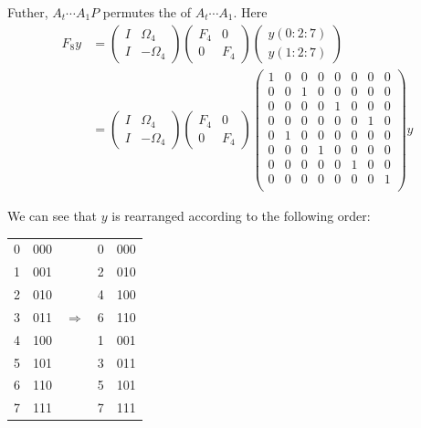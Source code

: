 Futher, $A_t \cdots A_1 P$ permutes the  of $A_t \cdots A_1$. Here \begin{align*}
    F_8 y & = \begin{pmatrix}
        I & \Omega_4 \\
        I & -\Omega_4
    \end{pmatrix} \begin{pmatrix}
        F_4 & 0 \\
        0 & F_4
    \end{pmatrix} \begin{pmatrix}
        y(0: 2 : 7) \\
        y(1: 2 : 7)
    \end{pmatrix} \\
    & = \begin{pmatrix}
        I & \Omega_4 \\
        I & -\Omega_4
    \end{pmatrix} \begin{pmatrix}
        F_4 & 0 \\
        0 & F_4
    \end{pmatrix} \begin{pmatrix}
        1   &   0   &   0   &   0   &   0   &   0   &   0   &   0   \\
        0   &   0   &   1   &   0   &   0   &   0   &   0   &   0   \\
        0   &   0   &   0   &   0   &   1   &   0   &   0   &   0   \\
        0   &   0   &   0   &   0   &   0   &   0   &   1   &   0   \\
        0   &   1   &   0   &   0   &   0   &   0   &   0   &   0   \\
        0   &   0   &   0   &   1   &   0   &   0   &   0   &   0   \\
        0   &   0   &   0   &   0   &   0   &   1   &   0   &   0   \\
        0   &   0   &   0   &   0   &   0   &   0   &   0   &   1   \\
    \end{pmatrix}
    y
\end{align*}

\newpage

We can see that $y$ is rearranged according to the following order: \begin{center}
\begin{tabular}{rrrrr}
    0 & 000 &               & 0 & 000  \\
    1 & 001 &               & 2 & 010  \\
    2 & 010 &               & 4 & 100  \\
    3 & 011 &$\Rightarrow$  & 6 & 110  \\
    4 & 100 &               & 1 & 001  \\
    5 & 101 &               & 3 & 011  \\
    6 & 110 &               & 5 & 101  \\
    7 & 111 &               & 7 & 111 
\end{tabular}
\end{center}

